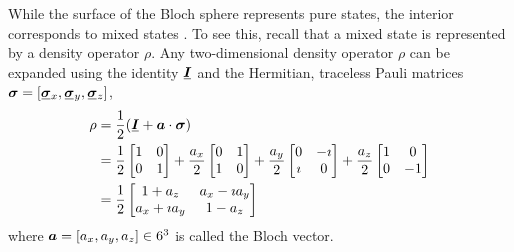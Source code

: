 While the surface of the Bloch sphere represents pure states, the interior corresponds to mixed states \cite{wikipediaBlochSphere}.
To see this, recall that a mixed state is represented by a density operator $\rho$.
Any two-dimensional density operator $\rho$ can be expanded using the identity $\matr{I}$ and the Hermitian, traceless Pauli matrices 
$
\vect{\sigma} = [\matr{\sigma}_x, \matr{\sigma}_y, \matr{\sigma}_z]
$,
\[
\begin{aligned}
\rho 
&=
\frac{1}{2}(\matr{I} + \vect{a} \cdot \vect{\sigma}) 
\\
&=
\frac{1}{2}
\begin{bmatrix}
1 & 0 \\
0 & 1
\end{bmatrix}
+
\frac{a_x}{2}
\begin{bmatrix}
0 & 1 \\
1 & 0
\end{bmatrix}
+
\frac{a_y}{2}
\begin{bmatrix}
0 & -\iu \\
\iu & 0
\end{bmatrix}
+
\frac{a_z}{2}
\begin{bmatrix}
1 & 0 \\
0 & -1
\end{bmatrix}
\\
&=\frac{1}{2}
\begin{bmatrix}
1+a_z & a_x-\iu a_y \\
a_x+\iu a_y & 1-a_z
\end{bmatrix}
\end{aligned}
\]
where 
$
{\boldsymbol{a}} = [a_x, a_y, a_z] \in 6^3
$ 
is called the Bloch vector.




